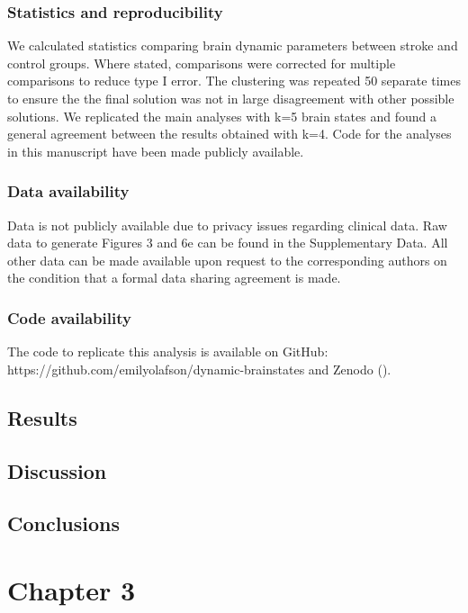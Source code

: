 \documentclass[phd,tocprelim]{cornell}
\begin{document}
    \subsection*{Statistics and reproducibility}
    We calculated statistics comparing brain dynamic parameters between stroke and control groups. Where stated, comparisons were corrected for multiple comparisons to reduce type I error. The clustering was repeated 50 separate times to ensure the the final solution was not in large disagreement with other possible solutions. We replicated the main analyses with k=5 brain states and found a general agreement between the results obtained with k=4. Code for the analyses in this manuscript have been made publicly available. 
    
	\subsection*{Data availability}
	 Data is not publicly available due to privacy issues regarding clinical data. Raw data to generate Figures 3 and 6e can be found in the Supplementary Data. All other data can be made available upon request to the corresponding authors on the condition that a formal data sharing agreement is made. 

	\subsection*{Code availability}
	 The code to replicate this analysis is available on GitHub: https://github.com/emilyolafson/dynamic-brainstates and Zenodo (\cite{Olafson2022-ul}).
	 
\section{Results}

\section{Discussion}

\section{Conclusions}

\label{chap:2}
\chapter{Chapter 3}
\end{document}
